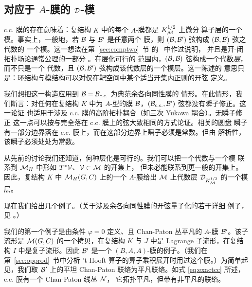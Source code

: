 
\subsection{对应于 $A$-膜的 ${\cal D}$-模}
\label{sec:dmab}

c.c. 膜的存在意味着：复结构 $K$ 中的每个 $A$-膜都是 $K_\M^{1/2}$ 上微分
算子层的一个模。事实上，一般地，若 ${\cal B}$ 与 ${\cal B}'$ 是任意两个
膜，则 $({\cal B},{\cal B}')$ 弦构成 $({\cal B},{\cal B})$ 弦之代数的
一个模。这一想法在第~\ref{sec:comptwo}~节 的 \dunamp\ 中作过说明，
并且是开-闭拓扑场论通常公理的一部分 \cite{ref142,ref143}。在层化可行的
范围内，$({\cal B},{\cal B})$ 弦构成一个代数\emph{层}，而不只是一个
代数，且 $({\cal B},{\cal B}')$ 弦构成该代数层的一个模层。这一陈述的
意思只是：环结构与模结构可以对仅在靶空间中某个适当开集内正则的开弦
定义。

我们想把这一构造应用到 ${\cal B}={\cal B}_{c.c.}$ 为典范余各向同性膜的
情形。在此情形，我们断言：对任何在复结构 $K$ 中为 $A$-型的膜
${\cal B}$，$({\cal B}_{c.c.},{\cal B}')$ 弦都没有瞬子修正。这一论证
也适用于涉及 c.c. 膜的高阶拓扑耦合（如三次 Yukawa 耦合）。无瞬子修正
这一点可以按与完全落在 c.c. 膜上的弦大致相同的方式论证。相关的圆盘
瞬子有一部分边界落在 c.c. 膜上，而在这部分边界上瞬子必须是常数。但由
解析性，该瞬子必须处处为常数。

从先前的讨论我们还知道，何种层化是可行的。我们可以把一个代数与一个模
联系到 $\MH$ 中形如 $T^*{{\cal V}}$、${{\cal V}}\subset \M$ 的开集上，
但未必能联系到更一般的开集上。因此，复结构 $K$ 中 $\MH(G,C)$ 上的一个
$A$-膜给出 $\M$ 上代数层 ${\cal D}_{K_{
\EUM}^{1/2}}$ 的一个模层。

现在我们给出几个例子。（关于涉及余各向同性膜的开弦量子化的若干详细
例子，见 \cite{ref144}。）

我们的第一个例子是由条件 $\varphi=0$ 定义、且 Chan-Paton 丛平凡的
$A$-膜 ${\cal B}'$。该子流形是 $\cM(G,C)$ 的一个拷贝，在复结构 $K$ 与
$J$ 中是 Lagrange 子流形，在复结构 $I$ 中是复子流形。因此 ${\cal B}'$
是一个 $(B,A,A)$-膜的例子。（我们在第~\ref{sec:opprod}~节中分析
't Hooft 算子的算子乘积展开时用过这个膜。）为简单起见，我们取
${\cal B}'$ 上的平坦 Chan-Paton 联络为平凡联络。如式
\eqref{eq:exactcc} 所述，c.c. 膜有一个 Chan-Paton 线丛 ${\cal N}$，
它拓扑平凡，但带有非平凡的联络。

